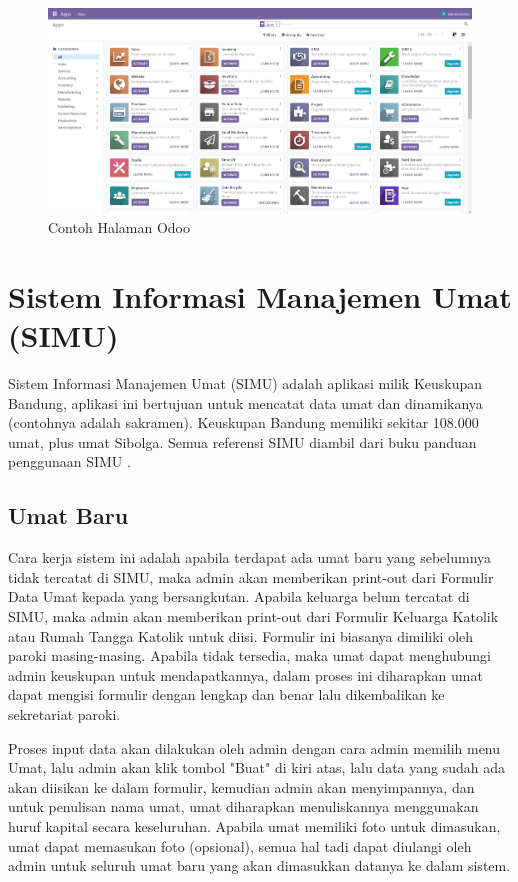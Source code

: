 \begin{figure}[H]
	\centering
	\includegraphics[scale=0.4]{Gambar/halamanOdoo.png}
	\caption{Contoh Halaman Odoo} 
	\label{fig:halamanOdoo}
\end{figure}

\newpage

\section{Sistem Informasi Manajemen Umat (SIMU)}
\label{sec:simu}
Sistem Informasi Manajemen Umat (SIMU) adalah aplikasi milik Keuskupan Bandung, aplikasi ini bertujuan untuk mencatat data umat dan dinamikanya (contohnya adalah sakramen). Keuskupan Bandung memiliki sekitar 108.000 umat, plus umat Sibolga. Semua referensi SIMU diambil dari buku panduan penggunaan SIMU \cite{pascal}. 
 
\subsection{Umat Baru}
\label{sec:umatBaru}
Cara kerja sistem ini adalah apabila terdapat ada umat baru yang sebelumnya tidak tercatat di SIMU, maka admin akan memberikan print-out dari Formulir Data Umat kepada yang bersangkutan. Apabila keluarga belum tercatat di SIMU, maka admin akan memberikan print-out dari Formulir Keluarga Katolik atau Rumah Tangga Katolik untuk diisi. Formulir ini biasanya dimiliki oleh paroki masing-masing. Apabila tidak tersedia, maka umat dapat menghubungi admin keuskupan untuk mendapatkannya, dalam proses ini diharapkan umat dapat mengisi formulir dengan lengkap dan benar lalu dikembalikan ke sekretariat paroki. 

Proses input data akan dilakukan oleh admin dengan cara admin memilih menu Umat, lalu admin akan klik tombol "Buat" di kiri atas, lalu data yang sudah ada akan diisikan ke dalam formulir, kemudian admin akan menyimpannya, dan untuk penulisan nama umat, umat diharapkan menuliskannya menggunakan huruf kapital secara keseluruhan. Apabila umat memiliki foto untuk dimasukan, umat dapat memasukan foto (opsional), semua hal tadi dapat diulangi oleh admin untuk seluruh umat baru yang akan dimasukkan datanya ke dalam sistem.

